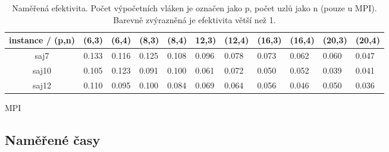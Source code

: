 \documentclass{article}
\begin{document}
\begin{table}[h]
        \begin{subtable}{.5\linewidth}\centering
            \centering
            \begin{tabular}{|c|c|c|l|l|l|l|l|l|l|l|}
                \hline
                \textbf{instance / (p,n)} &
                \textbf{(6,3)} &
                \textbf{(6,4)} &
                \multicolumn{1}{c|}{\textbf{(8,3)}} &
                \multicolumn{1}{c|}{\textbf{(8,4)}} &
                \textbf{12,3)} &
                \textbf{(12,4)} &
                \textbf{(16,3)} &
                \textbf{(16,4)} &
                \textbf{(20,3)} &
                \textbf{(20,4)} \\ \hline
                saj7  & 0.133 & 0.116 & 0.125 & 0.108 & 0.096 & 0.078 & 0.073 & 0.062 & 0.060 & 0.047 \\ \hline
                saj10 & 0.105 & 0.123 & 0.091 & 0.100 & 0.061 & 0.072 & 0.050 & 0.052 & 0.039 & 0.041 \\ \hline
                saj12 & 0.110 & 0.095 & 0.100 & 0.084 & 0.069 & 0.064 & 0.056 & 0.046 & 0.050 & 0.036 \\ \hline
            \end{tabular}
            \caption{MPI}
            \label{tab:efektivita-mpi}
        \end{subtable}

    \caption{Naměřená efektivita. Počet výpočetních vláken je označen jako p, počet uzlů jako n (pouze u MPI). Barevně zvýrazněná je efektivita větší než 1.}
        \label{tab:efektivita}
    \end{table}

    \subsection{Naměřené časy}
\end{document}
